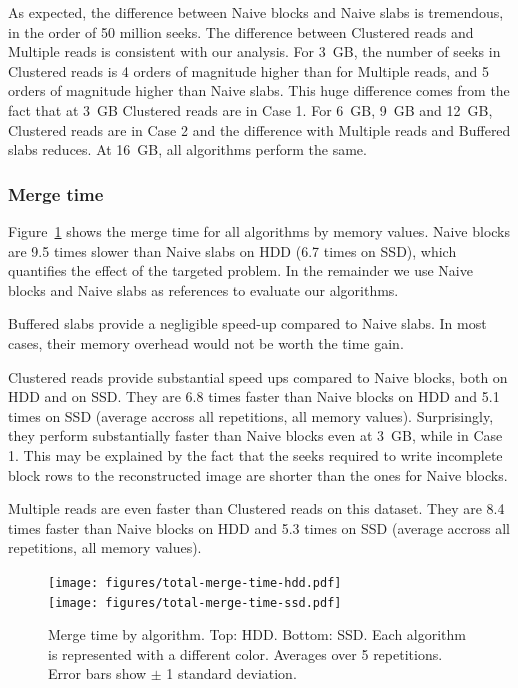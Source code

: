 \documentclass[10pt, conference, compsocconf]{IEEEtran}
\begin{document}
As expected, the difference between Naive blocks and Naive slabs is
tremendous, in the order of 50 million seeks. The difference between
Clustered reads and Multiple reads is consistent with our analysis. For
3~GB, the number of seeks in Clustered reads is 4 orders of magnitude
higher than for Multiple reads, and 5 orders of magnitude higher than
Naive slabs. This huge difference comes from the fact that at 3~GB
Clustered reads are in Case 1. For 6~GB, 9~GB and 12~GB, Clustered
reads are in Case 2 and the difference with Multiple reads and
Buffered slabs reduces. At 16~GB, all algorithms perform the same.

\subsubsection{Merge time}

Figure~\ref{fig:merge-time} shows the merge time for all algorithms by
memory values. Naive blocks are 9.5 times slower than Naive slabs on
HDD (6.7 times on SSD), which quantifies the effect of the targeted
problem.  In the remainder we use Naive blocks
and Naive slabs as references to evaluate our algorithms.

Buffered slabs provide a negligible speed-up compared to Naive
slabs. In most cases, their memory overhead would not be worth the
time gain.

Clustered reads provide substantial speed ups compared to Naive blocks,
both on HDD and on SSD. They are 6.8 times faster than Naive blocks on
HDD and 5.1 times on SSD (average accross all repetitions, all memory
values). Surprisingly, they perform substantially faster than Naive
blocks even at 3~GB, while in Case 1. This may be explained by the
fact that the seeks required to write incomplete block rows to the
reconstructed image are shorter than the ones for Naive blocks.

Multiple reads are even faster than Clustered reads on this
dataset. They are 8.4 times faster than Naive blocks on HDD and 5.3
times on SSD (average accross all repetitions, all memory values).

\begin{figure}[h]
  \centering
  \texttt{[image: figures/total-merge-time-hdd.pdf]}\\
  \texttt{[image: figures/total-merge-time-ssd.pdf]}
  \hfill
  \caption{Merge time by algorithm. Top: HDD. Bottom: SSD. Each
    algorithm is represented with a different color. Averages over 5
    repetitions. Error bars show $\pm$ 1 standard deviation. }
\label{fig:merge-time}
\end{figure}
\end{document}

